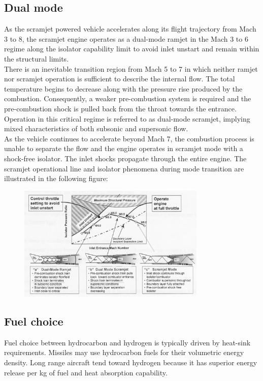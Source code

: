 \documentclass[12pt]{article}
\begin{document}
\subsection{Dual mode}

As the scramjet powered vehicle accelerates along its flight trajectory from Mach 3 to 8, the scramjet engine operates as a dual-mode ramjet in the Mach 3 to 6 regime along the isolator capability limit to avoid inlet unstart and remain within the structural limits.\\
There is an inevitable transition region from Mach 5 to 7 in which neither ramjet nor scramjet operation is sufficient to describe the internal flow. The total temperature begins to decrease along with the pressure rise produced by the combustion. Consequently, a weaker pre-combustion system is required and the pre-combustion shock is pulled back from the throat towards the entrance. Operation in this critical regime is referred to as dual-mode scramjet, implying mixed characteristics of both subsonic and supersonic flow.\\
As the vehicle continues to accelerate beyond Mach 7, the combustion process is unable to separate the flow and the engine operates in scramjet mode with a shock-free isolator. The inlet shocks propagate through the entire engine. The scramjet operational line and isolator phenomena during mode transition are illustrated in the following figure:

\begin{figure}[!ht]
\centering
\includegraphics[width=0.8\textwidth]{figures/dualmode.png}
\end{figure}

\subsection{Fuel choice}

Fuel choice between hydrocarbon and hydrogen is typically driven by heat-sink requirements. Missiles may use hydrocarbon fuels for their volumetric energy density. Long range aircraft tend toward hydrogen because it has superior energy release per kg of fuel and heat absorption capability.
\end{document}
